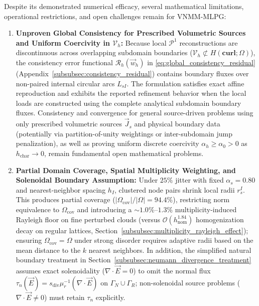 \documentclass[VANCOUVER,Times1COL]{WileyNJD-v5}
\begin{document}
Despite its demonstrated numerical efficacy, several mathematical limitations, operational restrictions, and open challenges remain for VNMM-MLPG:
\begin{enumerate}
    \item \textbf{Unproven Global Consistency for Prescribed Volumetric Sources and Uniform Coercivity in $\mathcal{V}_h$:} Because local $\mathcal{P}^1$ reconstructions are discontinuous across overlapping subdomain boundaries ($\mathcal{V}_h \not\subset H(\mathbf{curl};\Omega)$), the consistency error functional $\mathcal{R}_h(\vec{w}_h)$ in \eqref{eq:global_consistency_residual} (Appendix~\ref{subsubsec:consistency_residual}) contains boundary fluxes over non-paired internal circular arcs $L_{sI}$. The formulation satisfies exact affine reproduction and exhibits the reported refinement behavior when the local loads are constructed using the complete analytical subdomain boundary fluxes. Consistency and convergence for general source-driven problems using only prescribed volumetric sources $\vec{J}_s$ and physical boundary data (potentially via partition-of-unity weightings or inter-subdomain jump penalization), as well as proving uniform discrete coercivity $\alpha_h \ge \alpha_0 > 0$ as $h_{\mathrm{char}} \to 0$, remain fundamental open mathematical problems.
    \item \textbf{Partial Domain Coverage, Spatial Multiplicity Weighting, and Solenoidal Boundary Assumption:} Under $25\%$ jitter with fixed $\alpha_s = 0.80$ and nearest-neighbor spacing $h_I$, clustered node pairs shrink local radii $r_s^I$. This produces partial coverage ($|\Omega_{\mathrm{cov}}|/|\Omega| = 94.4\%$), restricting norm equivalence to $\Omega_{\mathrm{cov}}$ and introducing a $\sim 1.0\%\text{--}1.3\%$ multiplicity-induced Rayleigh floor on fine perturbed clouds (versus $\mathcal{O}(h_{\mathrm{nom}}^{1.84})$ homogenization decay on regular lattices, Section~\ref{subsubsec:multiplicity_rayleigh_effect}); ensuring $\Omega_{\mathrm{cov}} = \Omega$ under strong disorder requires adaptive radii based on the mean distance to the $k$ nearest neighbors. In addition, the simplified natural boundary treatment in Section~\ref{subsubsec:neumann_divergence_treatment} assumes exact solenoidality ($\nabla \cdot \vec{E} = 0$) to omit the normal flux $\tau_n(\vec{E}) = s_{\mathrm{div}}\mu_r^{-1}(\nabla \cdot \vec{E})$ on $\Gamma_N \cup \Gamma_R$; non-solenoidal source problems ($\nabla \cdot \vec{E} \ne 0$) must retain $\tau_n$ explicitly.

\end{enumerate}
\end{document}
